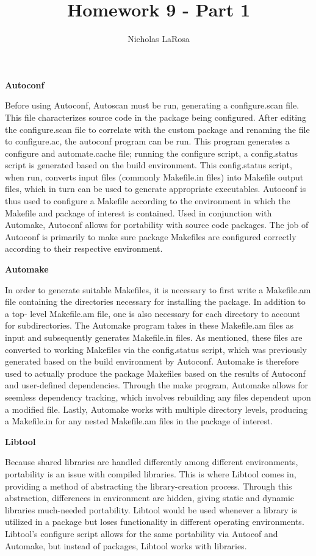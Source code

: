 \documentclass{article}
\begin{document}
\title{Homework 9 - Part 1}
\author{Nicholas LaRosa}

\maketitle

\large{\textbf{Autoconf}}
	
	Before using Autoconf, Autoscan must be run, generating a configure.scan file. 
This file characterizes source code in the package being configured. After editing the
configure.scan file to correlate with the custom package and renaming the file to configure.ac,
the autoconf program can be run. This program generates a configure and automate.cache file;
running the configure script, a config.status script is generated based on the build environment.
This config.status script, when run, converts input files (commonly Makefile.in files) into
Makefile output files, which in turn can be used to generate appropriate executables.
	Autoconf is thus used to configure a Makefile according to the environment in which
the Makefile and package of interest is contained. Used in conjunction with Automake, Autoconf
allows for portability with source code packages. The job of Autoconf is primarily to make sure
package Makefiles are configured correctly according to their respective environment.

\large{\textbf{Automake}}

	In order to generate suitable Makefiles, it is necessary to first write a Makefile.am
file containing the directories necessary for installing the package. In addition to a top-
level Makefile.am file, one is also necessary for each directory to account for subdirectories.
The Automake program takes in these Makefile.am files as input and subsequently generates 
Makefile.in files. As mentioned, these files are converted to working Makefiles via the 
config.status script, which was previously generated based on the build environment by Autoconf. 
	Automake is therefore used to actually produce the package Makefiles based on the
results of Autoconf and user-defined dependencies. Through the make program, Automake allows
for seemless dependency tracking, which involves rebuilding any files dependent upon a modified
file. Lastly, Automake works with multiple directory levels, producing a Makefile.in for any
nested Makefile.am files in the package of interest.

\large{\textbf{Libtool}}

	Because shared libraries are handled differently among different environments, 
portability is an issue with compiled libraries. This is where Libtool comes in, providing
a method of abstracting the library-creation process. Through this abstraction, differences
in environment are hidden, giving static and dynamic libraries much-needed portability.
Libtool would be used whenever a library is utilized in a package but loses 
functionality in different operating environments. Libtool's configure script allows for 
the same portability via Autocof and Automake, but instead of packages, Libtool works
with libraries.
\end{document}
